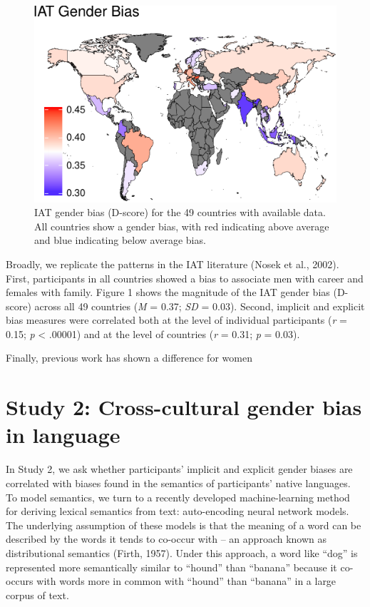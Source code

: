 \documentclass[10pt, letterpaper]{article}
\newenvironment{CodeChunk}{}{}
\begin{document}
\begin{CodeChunk}
\begin{figure}[t]

{\centering \includegraphics{figs/map-1} 

}

\caption[IAT gender bias (D-score) for the 49 countries with available data]{IAT gender bias (D-score) for the 49 countries with available data. All countries show a gender bias, with red indicating above average and blue indicating below average bias.}\label{fig:map}
\end{figure}
\end{CodeChunk}

Broadly, we replicate the patterns in the IAT literature (Nosek et al.,
2002). First, participants in all countries showed a bias to associate
men with career and females with family. Figure 1 shows the magnitude of
the IAT gender bias (D-score) across all 49 countries (\emph{M} = 0.37;
\emph{SD} = 0.03). Second, implicit and explicit bias measures were
correlated both at the level of individual participants (\emph{r} =
0.15; \emph{p} \textless{} .00001) and at the level of countries
(\emph{r} = 0.31; \emph{p} = 0.03).

Finally, previous work has shown a difference for women

\section{Study 2: Cross-cultural gender bias in
language}\label{study-2-cross-cultural-gender-bias-in-language}

In Study 2, we ask whether participants' implicit and explicit gender
biases are correlated with biases found in the semantics of
participants' native languages. To model semantics, we turn to a
recently developed machine-learning method for deriving lexical
semantics from text: auto-encoding neural network models. The underlying
assumption of these models is that the meaning of a word can be
described by the words it tends to co-occur with -- an approach known as
distributional semantics (Firth, 1957). Under this approach, a word like
``dog'' is represented more semantically similar to ``hound'' than
``banana'' because it co-occurs with words more in common with ``hound''
than ``banana'' in a large corpus of text.
\end{document}
